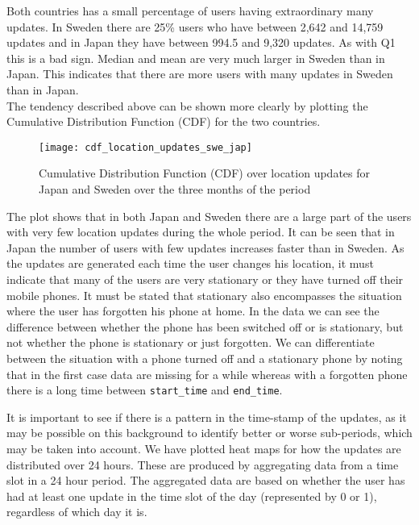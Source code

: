 Both countries has a small percentage of users having extraordinary many updates. In Sweden there are 25\% users who have between 2,642 and 14,759 updates and in Japan they have between 994.5 and 9,320 updates. As with Q1 this is a bad sign. 
Median and mean are very much larger in Sweden than in Japan. This indicates that there are more users with many updates in Sweden than in Japan.  \\

The tendency described above can be shown more clearly by plotting the Cumulative Distribution Function (CDF) for the two countries.  
 
\begin{figure}[H]
    \hspace*{-1.0cm}
    \centering
    \texttt{[image: cdf\_location\_updates\_swe\_jap]}
    \caption{Cumulative Distribution Function (CDF) over location updates for Japan and Sweden over the three months of the period}
    \label{fig:country_cdf}
\end{figure}

The plot shows that in both Japan and Sweden there are a large part of the users with very few location updates during the whole period. It can be seen that in Japan the number of users with few updates increases faster than in Sweden.  
As the updates are generated each time the user changes his location, it must indicate that many of the users are very stationary or they have turned off their mobile phones. It must be stated that stationary also encompasses the situation where the user has forgotten his phone at home. In the data we can see the difference between whether the phone has been switched off or is stationary, but not whether the phone is stationary or just forgotten. We can differentiate between the situation with a phone turned off and a stationary phone by noting that in the first case data are missing for a while whereas with a forgotten phone there is a long time between \texttt{start\_time} and \texttt{end\_time}.  

It is important to see if there is a pattern in the time-stamp of the updates, as it may be possible on this background to identify better or worse sub-periods, which may be taken into account. 
We have plotted heat maps for how the updates are distributed over 24 hours. These are produced by aggregating data from a time slot in a 24 hour period. The aggregated data are based on whether the user has had at least one update in the time slot of the day (represented by 0 or 1), regardless of which day it is. 

